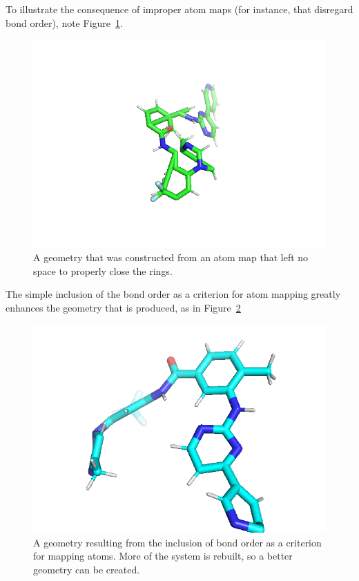 %
To illustrate the consequence of improper atom maps (for instance, that disregard bond order), note Figure~\ref{fig:badbondorder}.
%
\begin{figure}
    \centering
    \includegraphics[width=1.0\textwidth]{failed_ring.png}
    \caption{A geometry that was constructed from an atom map that left no space to properly close the rings.}
    \label{fig:badbondorder}
\end{figure}
%
The simple inclusion of the bond order as a criterion for atom mapping greatly enhances the geometry that is produced, as in Figure~\ref{fig:goodbondorder}
%
\begin{figure}
    \centering
    \includegraphics[width=1.0\textwidth]{success_ring_closure.png}
    \caption{A geometry resulting from the inclusion of bond order as a criterion for mapping atoms. More of the system is rebuilt, so a better geometry can be created.}
    \label{fig:goodbondorder}
\end{figure}
%
